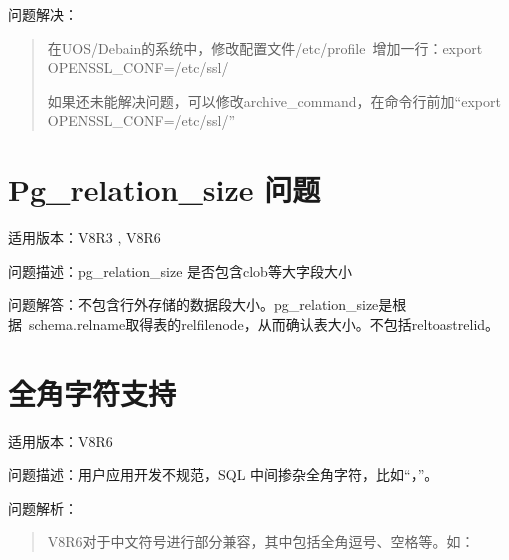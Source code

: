 \documentclass[letterpaper,10pt,english]{sphinxmanual}
\let\sphinxpxdimen\pdfpxdimen\else\newdimen\sphinxpxdimen
\begin{document}
\begin{sphinxVerbatim}[commandchars=\\\{\}]
     
          
\end{sphinxVerbatim}

问题解决：
\begin{quote}

在UOS/Debain的系统中，修改配置文件/etc/profile 增加一行：export OPENSSL\_CONF=/etc/ssl/

如果还未能解决问题，可以修改archive\_command，在命令行前加“export OPENSSL\_CONF=/etc/ssl/”
\end{quote}


\section{Pg\_relation\_size 问题}
\label{\detokenize{sql:pg-relation-size}}
适用版本：V8R3 , V8R6

问题描述：pg\_relation\_size 是否包含clob等大字段大小

问题解答：不包含行外存储的数据段大小。pg\_relation\_size是根据 schema.relname取得表的relfilenode，从而确认表大小。不包括reltoastrelid。


\section{全角字符支持}
\label{\detokenize{sql:id20}}
适用版本：V8R6

问题描述：用户应用开发不规范，SQL 中间掺杂全角字符，比如“，”。

问题解析：
\begin{quote}

V8R6对于中文符号进行部分兼容，其中包括全角逗号、空格等。如：

\begin{figure}[htbp]
\centering

\noindent\sphinxincludegraphics[width=243\sphinxpxdimen,height=56\sphinxpxdimen]{{FAQ13964}.png}
\end{figure}
\end{quote}
\end{document}
